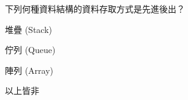 \ifx\ntpcNinetyTwo\undefined[92學年基北區] \fi
下列何種資料結構的資料存取方式是先進後出？
  \begin{optionlist}
  \item 堆疊 (Stack)\label{ntpc-92-a6}
  \item 佇列 (Queue)
  \item 陣列 (Array)
  \item 以上皆非
  \end{optionlist}